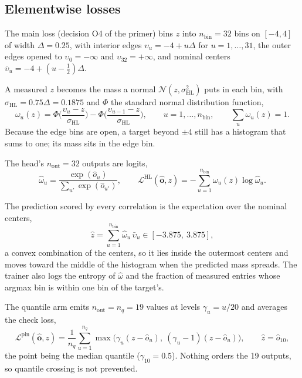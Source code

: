 \subsection{Elementwise losses}
\label{sec:elementwise}

The main loss (decision O4 of the primer) bins $z$ into $n_{\mathrm{bin}} = 32$ bins on
$[-4, 4]$ of width $\Delta = 0.25$, with interior edges $\upsilon_u = -4 + u\Delta$ for $u =
1, \ldots, 31$, the outer edges opened to $\upsilon_0 = -\infty$ and $\upsilon_{32} =
+\infty$, and nominal centers $\bar\upsilon_u = -4 + (u - \tfrac12)\Delta$.

A measured $z$ becomes the mass a normal $\mathcal{N}(z, \sigma_{\mathrm{HL}}^2)$ puts in
each bin, with $\sigma_{\mathrm{HL}} = 0.75\Delta = 0.1875$ and $\Phi$ the standard normal
distribution function,
\begin{equation}
\omega_u(z) = \Phi\!\Big(\frac{\upsilon_u - z}{\sigma_{\mathrm{HL}}}\Big) - \Phi\!\Big(\frac{\upsilon_{u-1} - z}{\sigma_{\mathrm{HL}}}\Big),
\qquad u = 1, \ldots, n_{\mathrm{bin}},
\qquad \sum_{u} \omega_u(z) = 1.
\label{eq:hltarget}
\end{equation}
Because the edge bins are open, a target beyond $\pm 4$ still has a histogram that sums to
one; its mass sits in the edge bin.

The head's $n_{\mathrm{out}} = 32$ outputs are logits,
\begin{equation}
\hat\omega_u = \frac{\exp(\hat o_u)}{\sum_{u'} \exp(\hat o_{u'})},
\qquad
\mathcal{L}^{\mathrm{HL}}(\hat{\mathbf{o}}, z) = -\sum_{u=1}^{n_{\mathrm{bin}}} \omega_u(z) \log \hat\omega_u.
\label{eq:hlce}
\end{equation}

The prediction scored by every correlation is the expectation over the nominal centers,
\begin{equation}
\hat z = \sum_{u=1}^{n_{\mathrm{bin}}} \hat\omega_u\, \bar\upsilon_u \in [-3.875,\ 3.875],
\label{eq:hlpoint}
\end{equation}
a convex combination of the centers, so it lies inside the outermost centers and moves
toward the middle of the histogram when the predicted mass spreads. The trainer also logs
the entropy of $\hat\omega$ and the fraction of measured entries whose argmax bin is within
one bin of the target's.

The quantile arm emits $n_{\mathrm{out}} = n_q = 19$ values at levels $\gamma_u = u/20$
and averages the check loss,
\begin{equation}
\mathcal{L}^{\mathrm{pin}}(\hat{\mathbf{o}}, z) = \frac{1}{n_q} \sum_{u=1}^{n_q} \max\!\big(\gamma_u (z - \hat o_u),\ (\gamma_u - 1)(z - \hat o_u)\big),
\qquad
\hat z = \hat o_{10},
\label{eq:pinball}
\end{equation}
the point being the median quantile ($\gamma_{10} = 0.5$). Nothing orders the 19 outputs,
so quantile crossing is not prevented.

